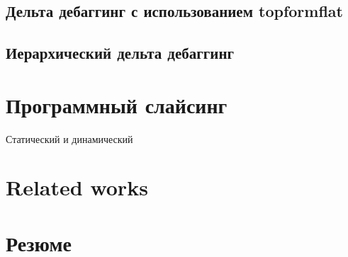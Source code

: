 \subsection{Дельта дебаггинг с использованием topformflat}
\subsection{Иерархический дельта дебаггинг}
\section{Программный слайсинг}
Статический и динамический 
\section{Related works}
\section{Резюме}
